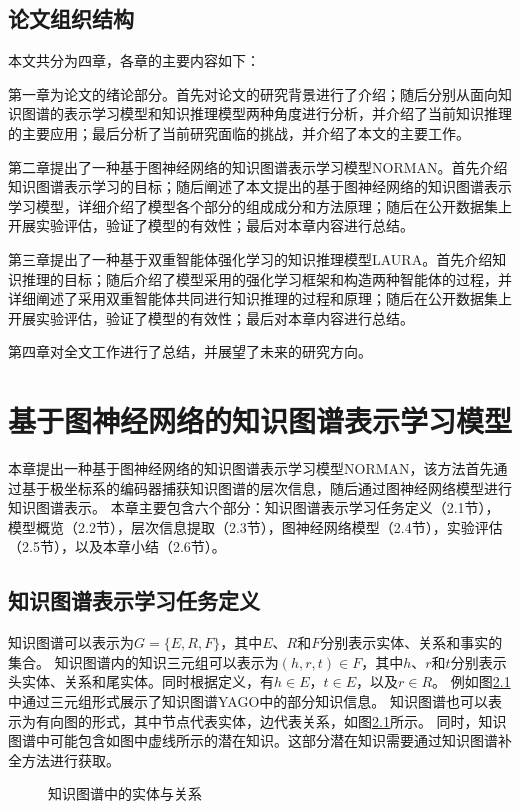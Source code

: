 \documentclass[algorithmlist, AutoFakeBold, AutoFakeSlant, figurelist, tablelist, nomlist, engineering, openany]{seuthesix} %
\begin{document}
\section{论文组织结构}
本文共分为四章，各章的主要内容如下：

第一章为论文的绪论部分。首先对论文的研究背景进行了介绍；随后分别从面向知识图谱的表示学习模型和知识推理模型两种角度进行分析，并介绍了当前知识推理的主要应用；最后分析了当前研究面临的挑战，并介绍了本文的主要工作。

第二章提出了一种基于图神经网络的知识图谱表示学习模型NORMAN。首先介绍知识图谱表示学习的目标；随后阐述了本文提出的基于图神经网络的知识图谱表示学习模型，详细介绍了模型各个部分的组成成分和方法原理；随后在公开数据集上开展实验评估，验证了模型的有效性；最后对本章内容进行总结。

第三章提出了一种基于双重智能体强化学习的知识推理模型LAURA。首先介绍知识推理的目标；随后介绍了模型采用的强化学习框架和构造两种智能体的过程，并详细阐述了采用双重智能体共同进行知识推理的过程和原理；随后在公开数据集上开展实验评估，验证了模型的有效性；最后对本章内容进行总结。

第四章对全文工作进行了总结，并展望了未来的研究方向。


\chapter{基于图神经网络的知识图谱表示学习模型}
本章提出一种基于图神经网络的知识图谱表示学习模型NORMAN，该方法首先通过基于极坐标系的编码器捕获知识图谱的层次信息，随后通过图神经网络模型进行知识图谱表示。
本章主要包含六个部分：知识图谱表示学习任务定义（2.1节），模型概览（2.2节），层次信息提取（2.3节），图神经网络模型（2.4节），实验评估（2.5节），以及本章小结（2.6节）。

\section{知识图谱表示学习任务定义}
知识图谱可以表示为$G=\{E, R, F\}$，其中$E$、$R$和$F$分别表示实体、关系和事实的集合。
知识图谱内的知识三元组可以表示为$(h, r, t) \in F$，其中$h$、$r$和$t$分别表示头实体、关系和尾实体。同时根据定义，有$h \in E$，$t \in E$，以及$r \in R$。
例如图\ref{2_KG}中通过三元组形式展示了知识图谱YAGO中的部分知识信息。
知识图谱也可以表示为有向图的形式，其中节点代表实体，边代表关系，如图\ref{2_KG}所示。
同时，知识图谱中可能包含如图中虚线所示的潜在知识。这部分潜在知识需要通过知识图谱补全方法进行获取。
\begin{figure}[H]
  \centering
  \caption{知识图谱中的实体与关系}
  \label{2_KG}
\end{figure}
\end{document}
